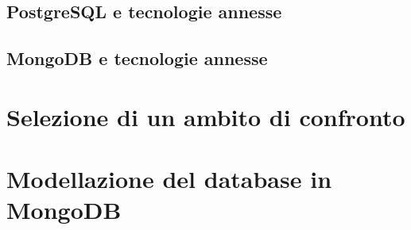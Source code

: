 \subsection{PostgreSQL e tecnologie annesse}

\subsection{MongoDB e tecnologie annesse}

\section{Selezione di un ambito di confronto}

\section{Modellazione del database in MongoDB}